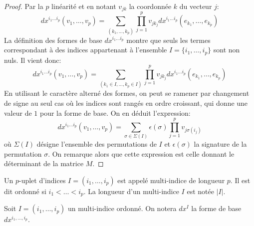 \begin{proof}
Par la $p$ linéarité et en notant $v_{jk}$ la coordonnée $k$ du vecteur $j$:
\[
dx^{i_1\dots i_p}(v_1,\dots,v_p) = \sum_{(k_1,\dots,k_p)} \prod_{j=1}^p v_{jk_j}dx^{i_1\dots i_p}(e_{k_1},\dots,e_{k_p})
\]
La définition des formes de base $dx^{i_1\dots i_p}$ montre que seuls les termes correspondant à des indices appartenant à l'ensemble $I = \{i_1, \dots , i_p\}$ sont non nuls. Il vient donc:
\[
dx^{i_1\dots i_p}(v_1,\dots,v_p) = \sum_{(k_1\in I,\dots,k_p\in I)} \prod_{j=1}^p v_{jk_j}dx^{i_1\dots i_p}(e_{k_1},\dots,e_{k_p})
\]
En utilisant le caractère alterné des formes, on peut se ramener par changement de signe au seul cas où les indices sont rangés en ordre croissant, qui donne une valeur de $1$ pour la forme de base. On en déduit l'expression:
\[
dx^{i_1\dots i_p}(v_1,\dots,v_p) = \sum_{\sigma \in \Sigma(I)} \epsilon(\sigma) \prod_{j=1}^p v_{j\sigma(i_j)}
\]
où $\Sigma(I)$ désigne l'ensemble des permutations de $I$ et $\epsilon(\sigma)$ la signature de la permutation $\sigma$. On remarque alors que cette expression est celle donnant le déterminant de la matrice $M$. 
\end{proof}
\begin{fdefn}
Un $p$-uplet d'indices $I=(i_1, \dots, i_p)$ est appelé multi-indice de longueur $p$. Il est dit ordonné si $i_1 < \dots < i_p$. La longueur d'un multi-indice $I$ est notée $|I|$.
\end{fdefn}
\begin{notation}
 Soit $I=(i_1, \dots, i_p)$ un multi-indice ordonné. On notera $dx^I$ la forme de base $dx^{i_1,\dots,i_p}$.
\end{notation}

